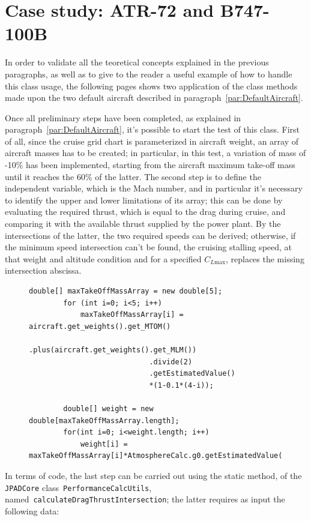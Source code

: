 \section{Case study: ATR-72 and B747-100B}
%
In order to validate all the teoretical concepts explained in the previous paragraphs, as well as to give to the reader a useful example of how to handle this class usage, the following pages shows two application of the class methods made upon the two default aircraft described in paragraph~\ref{par:DefaultAircraft}.

\bigskip
\noindent
Once all preliminary steps have been completed, as explained in paragraph~\ref{par:DefaultAircraft}, it's possible to start the test of this class. 
%
First of all, since the cruise grid chart is parameterized in aircraft weight, an array of aircraft masses has to be created; in particular, in this test, a variation of mass of -10\% has been implemented, starting from the aircraft maximum take-off mass until it reaches the 60\% of the latter. 
%
The second step is to define the independent variable, which is the Mach number, and in particular it's necessary to identify the upper and lower limitations of its array; this can be done by evaluating the required thrust, which is equal to the drag during cruise, and comparing it with the available thrust supplied by the power plant.
%
\noindent
By the intersections of the latter, the two required speeds can be derived; otherwise, if the minimum speed intersection can't be found, the cruising stalling speed, at that weight and altitude condition and for a specified $C_{L\text{max}}$, replaces the missing intersection abscissa.
%
\begin{figure}[t]
\begin{lstlisting}[caption={Mass variation in Specific Range test - B747-100B}, captionpos=b, tabsize=2]
		double[] maxTakeOffMassArray = new double[5];
		for (int i=0; i<5; i++)
			maxTakeOffMassArray[i] =	aircraft.get_weights().get_MTOM()
							.plus(aircraft.get_weights().get_MLM())
							.divide(2)
							.getEstimatedValue()
							*(1-0.1*(4-i));

		double[] weight = new double[maxTakeOffMassArray.length];
		for(int i=0; i<weight.length; i++)
			weight[i] = maxTakeOffMassArray[i]*AtmosphereCalc.g0.getEstimatedValue();
\end{lstlisting}
\end{figure}
%
In terms of code, the last step can be carried out using the static method, of the \lstinline[language=Java]!JPADCore! class~\lstinline[language=Java]!PerformanceCalcUtils!, named~\lstinline[language=Java]!calculateDragThrustIntersection!; the latter requires as input the following data:
